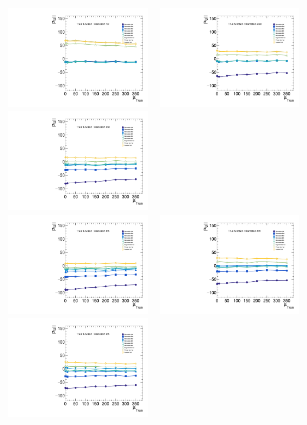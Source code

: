 \begin{figure}[!ht]
  \centering
  \includegraphics[width=0.33\textwidth]{Fig/BiasStudy/Linearity/HJpsiG/pull_mean_linearity_TrueFunc0}~
  \includegraphics[width=0.33\textwidth]{Fig/BiasStudy/Linearity/HJpsiG/pull_mean_linearity_TrueFunc1}~
  \includegraphics[width=0.33\textwidth]{Fig/BiasStudy/Linearity/HJpsiG/pull_mean_linearity_TrueFunc2}\\
  \includegraphics[width=0.33\textwidth]{Fig/BiasStudy/Linearity/HJpsiG/pull_mean_linearity_TrueFunc3}~
  \includegraphics[width=0.33\textwidth]{Fig/BiasStudy/Linearity/HJpsiG/pull_mean_linearity_TrueFunc4}~
  \includegraphics[width=0.33\textwidth]{Fig/BiasStudy/Linearity/HJpsiG/pull_mean_linearity_TrueFunc5}\\

\end{figure}
